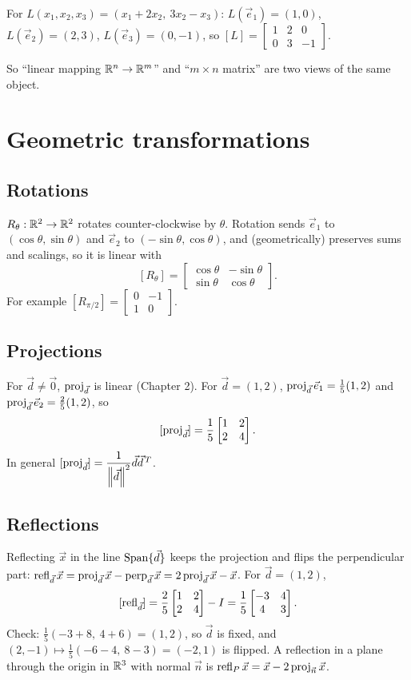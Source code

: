 \begin{example}
For $L(x_1,x_2,x_3)=(x_1+2x_2,\ 3x_2-x_3)$: $L(\vec e_1)=(1,0)$, $L(\vec e_2)=(2,3)$,
$L(\vec e_3)=(0,-1)$, so
$[L]=\begin{bmatrix}1&2&0\\0&3&-1\end{bmatrix}$.
\end{example}

So ``linear mapping $\mathbb{R}^n\to\mathbb{R}^m$'' and ``$m\times n$ matrix'' are two views of the same object.

\section{Geometric transformations}

\subsection*{Rotations}
$R_\theta:\mathbb{R}^2\to\mathbb{R}^2$ rotates counter-clockwise by $\theta$. Rotation sends $\vec e_1$ to
$(\cos\theta,\sin\theta)$ and $\vec e_2$ to $(-\sin\theta,\cos\theta)$, and (geometrically) preserves
sums and scalings, so it is linear with
\[
  [R_\theta]=\begin{bmatrix}\cos\theta&-\sin\theta\\ \sin\theta&\cos\theta\end{bmatrix}.
\]
For example $[R_{\pi/2}]=\begin{bmatrix}0&-1\\1&0\end{bmatrix}$.

\subsection*{Projections}
For $\vec d\ne\vec 0$, $\operatorname{proj}_{\vec d}$ is linear (Chapter 2). For $\vec d=(1,2)$,
$\operatorname{proj}_{\vec d}\vec e_1=\frac15(1,2)$ and $\operatorname{proj}_{\vec d}\vec e_2=\frac25(1,2)$, so
\[
  [\operatorname{proj}_{\vec d}]=\frac15\begin{bmatrix}1&2\\2&4\end{bmatrix}.
\]
In general $[\operatorname{proj}_{\vec d}]=\dfrac{1}{\left\lVert \vec d \right\rVert^2}\vec d\vec d^{\,T}$.

\subsection*{Reflections}
Reflecting $\vec x$ in the line $\operatorname{Span}\{\vec d\}$ keeps the projection and flips the perpendicular part:
$\operatorname{refl}_{\vec d}\vec x = \operatorname{proj}_{\vec d}\vec x-\operatorname{perp}_{\vec d}\vec x = 2\operatorname{proj}_{\vec d}\vec x-\vec x$. For
$\vec d=(1,2)$,
\[
  [\operatorname{refl}_{\vec d}] = \frac25\begin{bmatrix}1&2\\2&4\end{bmatrix}-I = \frac15\begin{bmatrix}-3&4\\4&3\end{bmatrix}.
\]
Check: $\frac15(-3+8,\ 4+6)=(1,2)$, so $\vec d$ is fixed, and $(2,-1)\mapsto\frac15(-6-4,\ 8-3)=(-2,1)$
is flipped. A reflection in a plane through the origin in $\mathbb{R}^3$ with normal $\vec n$ is
$\operatorname{refl}_P\vec x = \vec x - 2\operatorname{proj}_{\vec n}\vec x$.

